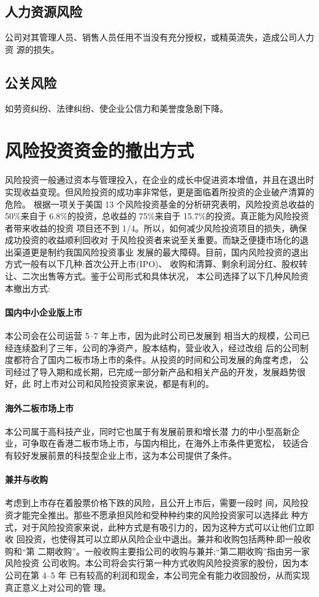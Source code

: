 \subsection{人力资源风险}
公司对其管理人员、销售人员任用不当没有充分授权，或精英流失，造成公司人力资
源的损失。

\subsection{公关风险}
如劳资纠纷、法律纠纷、使企业公信力和美誉度急剧下降。

\section{风险投资资金的撤出方式}
风险投资一般通过资本与管理投入，在企业的成长中促进资本增值，并且在退出时
实现收益变现。但风险投资的成功率非常低，更是面临着所投资的企业破产清算的危险。
根据一项关于美国 13 个风险投资基金的分析研究表明，风险投资总收益的 50\%来自于
6.8\%的投资，总收益的 75\%来自于 15.7\%的投资。真正能为风险投资者带来收益的投资
项目还不到 1/4。所以，如何减少风险投资项目的损失，确保成功投资的收益顺利回收对
于风险投资者来说至关重要。而缺乏便捷市场化的退出渠道更是制约我国风险投资事业
发展的最大障碍。目前，国内风险投资的退出方式一般有以下几种:首次公开上市(IPO)、
收购和清算、剩余利润分红、股权转让、二次出售等方式。鉴于公司形式和具体状况，
本公司选择了以下几种风险资本撤出方式:

\paragraph{国内中小企业版上市}
本公司会在公司运营 5--7 年上市，因为此时公司已发展到
相当大的规模，公司已经连续盈利了三年，公司的净资产，股本结构，营业收入，经过改组
后的公司制度都符合了国内二板市场上市的条件。从投资的时间和公司发展的角度考虑，
公司经过了导入期和成长期，已完成一部分新产品和相关产品的开发，发展趋势很好，此
时上市对公司和风险投资家来说，都是有利的。

\paragraph{海外二板市场上市}
本公司属于高科技产业，同时它也属于有发展前景和增长潜
力的中小型高新企业，可争取在香港二板市场上市，与国内相比，在海外上市条件更宽松，
较适合有较好发展前景的科技型企业上市，这为本公司提供了条件。

\paragraph{兼并与收购}
考虑到上市存在着股票价格下跌的风险，且公开上市后，需要一段时
间，风险投资才能完全推出。那些不愿承担风险和受种种约束的风险投资家可以选择此
种方式，对于风险投资家来说，此种方式是有吸引力的，因为这种方式可以让他们立即收
回投资，也使得其可以立即从风险企业中退出。兼并和收购包括两种:即一般收购和“第
二期收购”。一般收购主要指公司的收购与兼并;“第二期收购”指由另一家风险投资
公司收购。本公司将会实行第一种方式收购风险投资家的股份，因为本公司在第 4--5 年
已有较高的利润和现金，本公司完全有能力收回股份，从而实现真正意义上对公司的管
理。

